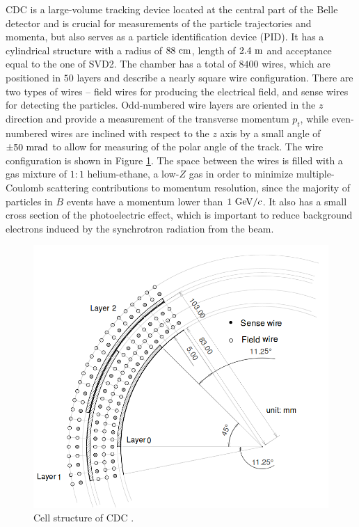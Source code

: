CDC is a large-volume tracking device located at the central part of the Belle detector and is crucial for measurements of the particle trajectories and momenta, but also serves as a particle identification device (PID). It has a cylindrical structure with a radius of $88\mathrm{~cm}$, length of $2.4\mathrm{~m}$ and acceptance equal to the one of SVD2. The chamber has a total of $8400$ wires, which are positioned in $50$ layers and describe a nearly square wire configuration. There are two types of wires -- field wires for producing the electrical field, and sense wires for detecting the particles. Odd-numbered wire layers are oriented in the $z$ direction and provide a measurement of the transverse momentum $p_t$, while even-numbered wires are inclined with respect to the $z$ axis by a small angle of $\pm 50\mathrm{~mrad}$ to allow for measuring of the polar angle of the track. The wire configuration is shown in Figure \ref{fig:CDC_layout}. The space between the wires is filled with a gas mixture of $1:1$ helium-ethane, a low-$Z$ gas in order to minimize multiple-Coulomb scattering contributions to momentum resolution, since the majority of particles in $B$ events have a momentum lower than $1\mathrm{~GeV}/c$. It also has a small cross section of the photoelectric effect, which is important to reduce background electrons induced by the synchrotron radiation from the beam. 

\begin{figure}[!htb]
	\centering
	\captionsetup{width=0.8\linewidth}
	\includegraphics[width=0.6\linewidth]{fig/setup/CDC_layout}
	\caption{Cell structure of CDC \cite{ABASHIAN2002117}.}
	\label{fig:CDC_layout}
\end{figure}

